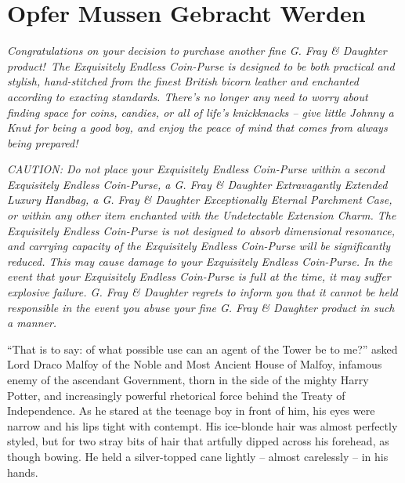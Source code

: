 \hypertarget{opfer-mussen-gebracht-werden}{%
\chapter{Opfer Mussen Gebracht
Werden}\label{opfer-mussen-gebracht-werden}}

\emph{Congratulations on your decision to purchase another fine G. Fray
\& Daughter product!~The Exquisitely Endless Coin-Purse is designed to
be both practical and stylish, hand-stitched from the finest British
bicorn leather and enchanted according to exacting standards. There's no
longer any need to worry about finding space for coins, candies, or all
of life's knickknacks -- give little Johnny a Knut for being a good boy,
and enjoy the peace of mind that comes from always being prepared!}

\emph{CAUTION: Do not place your Exquisitely Endless Coin-Purse within a
second Exquisitely Endless Coin-Purse, a G. Fray \& Daughter
Extravagantly Extended Luxury Handbag, a G. Fray \& Daughter
Exceptionally Eternal Parchment Case, or within any other item enchanted
with the Undetectable Extension Charm. The Exquisitely Endless
Coin-Purse is not designed to absorb dimensional resonance, and carrying
capacity of the Exquisitely Endless Coin-Purse will be significantly
reduced. This may cause damage to your Exquisitely Endless Coin-Purse.
In the event that your Exquisitely Endless Coin-Purse is full at the
time, it may suffer explosive failure. G. Fray \& Daughter regrets to
inform you that it cannot be held responsible in the event you abuse
your fine G. Fray \& Daughter product in such a manner.}\\

\mybreak

``That is to say: of what possible use can an agent of the Tower be to
me?'' asked Lord Draco Malfoy of the Noble and Most Ancient House of
Malfoy, infamous enemy of the ascendant Government, thorn in the side of
the mighty Harry Potter, and increasingly powerful rhetorical force
behind the Treaty of Independence. As he stared at the teenage boy in
front of him, his eyes were narrow and his lips tight with contempt. His
ice-blonde hair was almost perfectly styled, but for two stray bits of
hair that artfully dipped across his forehead, as though bowing. He held
a silver-topped cane lightly -- almost carelessly -- in his hands.

